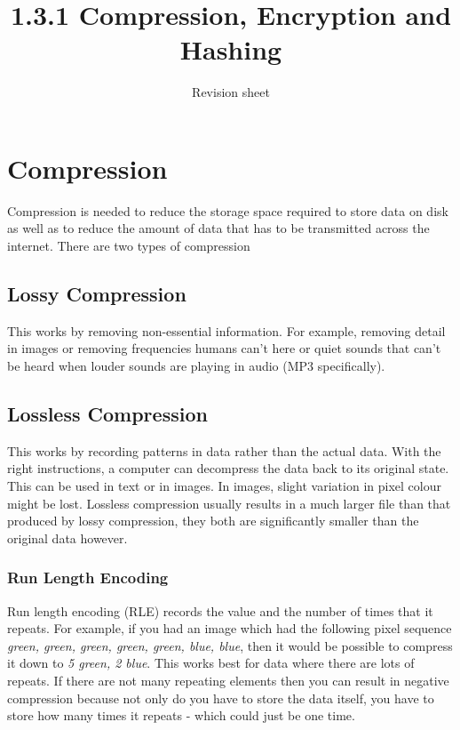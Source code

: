 \documentclass[a4paper,11pt, twocolumn]{article}
\title{1.3.1 Compression, Encryption and Hashing}
\author{Revision sheet}
\date{}
\begin{document}
\maketitle
\thispagestyle{fancy}

\section{Compression}
Compression is needed to reduce the storage space required to store data on disk as well as to reduce the amount of data that has to be transmitted across the internet. 
There are two types of compression
\subsection{Lossy Compression}
This works by removing non-essential information. For example, removing detail in images or removing frequencies humans can't here or quiet sounds that can't be heard when louder sounds are playing in audio (MP3 specifically). 
\subsection{Lossless Compression}
This works by recording patterns in data rather than the actual data. With the right instructions, a computer can decompress the data back to its original state. This can be used in text or in images. In images, slight variation in pixel colour might be lost. Lossless compression usually results in a much larger file than that produced by lossy compression, they both are significantly smaller than the original data however. 
\subsubsection{Run Length Encoding}
Run length encoding (RLE) records the value and the number of times that it repeats. For example, if you had an image which had the following pixel sequence \textit{green, green, green, green, green, blue, blue}, then it would be possible to compress it down to \textit{5 green, 2 blue}. This works best for data where there are lots of repeats. If there are not many repeating elements then you can result in negative compression because not only do you have to store the data itself, you have to store how many times it repeats - which could just be one time. 
\end{document}
